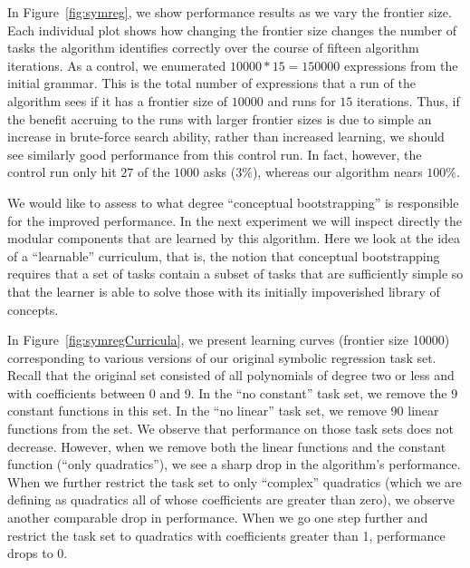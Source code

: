 \documentclass{article}
\begin{document}
In Figure~\ref{fig:symreg}, we show performance results as we vary the
frontier size. Each individual plot shows how changing the frontier
size changes the number of tasks the algorithm identifies correctly
over the course of fifteen algorithm iterations. As a control, we
enumerated $10000*15=150000$ expressions from the initial
grammar. This is the total number of expressions that a run of the
algorithm sees if it has a frontier size of $10000$ and runs for $15$
iterations. Thus, if the benefit accruing to the runs with larger
frontier sizes is due to simple an increase in brute-force search
ability, rather than increased learning, we should see similarly good
performance from this control run. In fact, however, the control run
only hit $27$ of the $1000$ asks ($3\%$), whereas our algorithm nears $100\%$.

We would like to assess to what degree ``conceptual bootstrapping'' is
responsible for the improved performance. In the next experiment we
will inspect directly the modular components that are learned by this
algorithm. Here we look at the idea of a ``learnable'' curriculum,
that is, the notion that conceptual bootstrapping requires that a
set of tasks contain a subset of tasks that are sufficiently simple so
that the learner is able to solve those with its initially
impoverished library of concepts. 

In Figure~\ref{fig:symregCurricula}, we present learning curves
(frontier size 10000) corresponding to various versions of our
original symbolic regression task set. Recall that the original set
consisted of all polynomials of degree two or less and with
coefficients between 0 and 9. In the ``no constant'' task set, we
remove the 9 constant functions in this set. In the ``no linear'' task
set, we remove 90 linear functions from the set. We observe that
performance on those task sets does not decrease. However, when we
remove both the linear functions and the constant function (``only
quadratics''), we see a sharp drop in the algorithm's
performance. When we further restrict the task set to only ``complex''
quadratics (which we are defining as quadratics all of whose
coefficients are greater than zero), we observe another comparable
drop in performance. When we go one step further and restrict the task
set to quadratics with coefficients greater than 1, performance drops
to 0.

\end{document}
